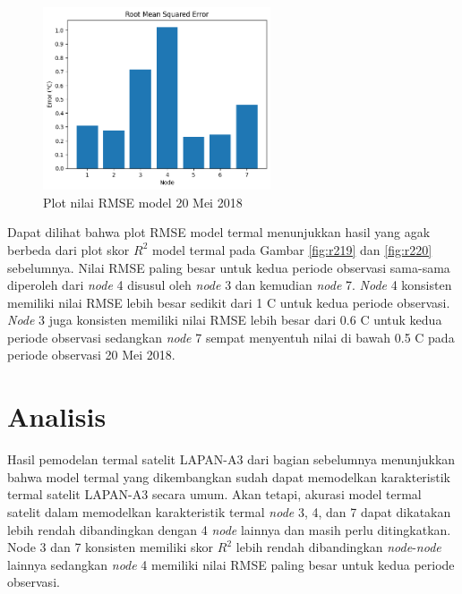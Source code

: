 \begin{figure}[H]
\setlength{}
\begin{center}
\includegraphics[width=0.6\textwidth]{fig/rmse_2018-05-20.png}
\caption{Plot nilai RMSE model 20 Mei 2018}
\label{fig:rmse20}
\end{center}
\end{figure}

Dapat dilihat bahwa plot RMSE model termal menunjukkan hasil yang agak berbeda
dari plot skor $R^2$ model termal pada Gambar \ref{fig:r219} dan \ref{fig:r220}
sebelumnya. Nilai RMSE paling besar untuk kedua periode observasi sama-sama
diperoleh dari \textit{node} 4 disusul oleh \textit{node} 3 dan kemudian \textit{node} 7. \textit{Node} 4 konsisten
memiliki nilai RMSE lebih besar sedikit dari 1 \degree C untuk kedua periode
observasi. \textit{Node} 3 juga konsisten memiliki nilai RMSE lebih besar dari 0.6
\degree C untuk kedua periode observasi sedangkan \textit{node} 7 sempat menyentuh nilai
di bawah 0.5 \degree C pada periode observasi 20 Mei 2018.

\section{Analisis}

Hasil pemodelan termal satelit LAPAN-A3 dari bagian sebelumnya menunjukkan
bahwa model termal yang dikembangkan sudah dapat memodelkan karakteristik
termal satelit LAPAN-A3 secara umum. Akan tetapi, akurasi model termal satelit
dalam memodelkan karakteristik termal \textit{node} 3, 4, dan 7 dapat dikatakan lebih
rendah dibandingkan dengan 4 \textit{node} lainnya dan masih perlu ditingkatkan. Node 3
dan 7 konsisten memiliki skor $R^2$ lebih rendah dibandingkan \textit{node}-\textit{node} lainnya
sedangkan \textit{node} 4 memiliki nilai RMSE paling besar untuk kedua periode
observasi.

